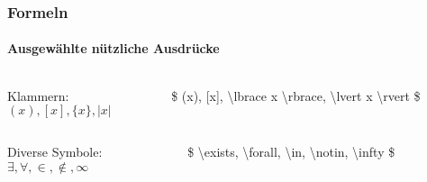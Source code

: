 \begin{frame}
\end{frame}


\begin{frame}
\frametitle{Formeln}
\framesubtitle{Ausgewählte nützliche Ausdrücke}
\begin{columns}
\begin{column}{.4\textwidth}
Klammern:\\
$ (x), [x], \lbrace x \rbrace, \lvert x \rvert $
\end{column}
\begin{column}{.6\textwidth}
{\ttfamily \color{unibayellowI} \$ \color{black} (x), [x], \color{nounibaredI}\textbackslash lbrace \color{black} x \color{nounibaredI}\textbackslash rbrace, \color{nounibaredI}\textbackslash lvert \color{black} x \color{nounibaredI}\textbackslash rvert \color{unibayellowI} \$ }
\end{column}
\end{columns}

\bigskip

\begin{columns}
\begin{column}{.4\textwidth}
Diverse Symbole:\\
$ \exists, \forall, \in, \notin, \infty $
\end{column}
\begin{column}{.6\textwidth}
{\ttfamily \color{unibayellowI} \$ \color{nounibaredI}\textbackslash exists\color{black}, \color{nounibaredI}\textbackslash forall\color{black}, \color{nounibaredI}\textbackslash in\color{black}, \color{nounibaredI}\textbackslash notin\color{black}, \color{nounibaredI}\textbackslash infty \color{unibayellowI} \$ }
\end{column}
\end{columns}


\end{frame}
